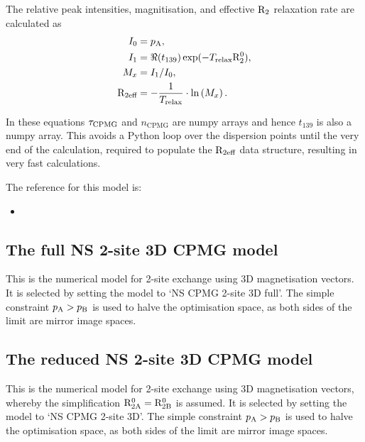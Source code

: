The relative peak intensities, magnitisation, and effective $\mathrm{R}_2$ relaxation rate are calculated as
\begin{subequations}
\begin{align}
    I_0 &= p_\textrm{A}, \\
    I_1 &= \Re(t_{139}) \exp(-T_\textrm{relax} \mathrm{R}_2^0), \\
    M_x &= I_1 / I_0, \\
    \mathrm{R}_\textrm{2eff} &= -\frac{1}{T_\textrm{relax}} \cdot \ln \left( M_x \right). \label{eq: R2eff NS CPMG 2-site expanded}
\end{align}
\end{subequations}

In these equations $\tau_\textrm{CPMG}$ and $n_\textrm{CPMG}$ are numpy arrays and hence $t_{139}$ is also a numpy array.  This avoids a Python loop over the dispersion points until the very end of the calculation, required to populate the $\mathrm{R}_\textrm{2eff}$ data structure, resulting in very fast calculations.

The reference for this model is:
\begin{itemize}
\item {}
\end{itemize}



\subsection{The full NS 2-site 3D CPMG model}
\label{sect: dispersion: NS CPMG 2-site 3D full model}

This is the numerical model for 2-site exchange using 3D magnetisation vectors.
It is selected by setting the model to `NS CPMG 2-site 3D full'.
The simple constraint $p_\textrm{A} > p_\textrm{B}$ is used to halve the optimisation space, as both sides of the limit are mirror image spaces.



\subsection{The reduced NS 2-site 3D CPMG model}
\label{sect: dispersion: NS CPMG 2-site 3D model}

This is the numerical model for 2-site exchange using 3D magnetisation vectors, whereby the simplification $\mathrm{R}_\mathrm{2A}^0 = \mathrm{R}_\mathrm{2B}^0$ is assumed.
It is selected by setting the model to `NS CPMG 2-site 3D'.
The simple constraint $p_\textrm{A} > p_\textrm{B}$ is used to halve the optimisation space, as both sides of the limit are mirror image spaces.


